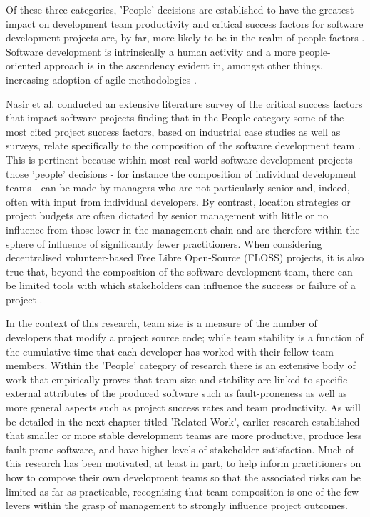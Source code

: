Of these three categories, 'People' decisions are established to have the greatest impact on development team productivity \citep{trendowicz2009factors} and critical success factors for software development projects are, by far, more likely to be in the realm of people factors \citep{boehm1978characteristics, onoue2018human}. Software development is intrinsically a human activity and a more people-oriented approach is in the ascendency evident in, amongst other things, increasing adoption of agile methodologies \citep{pirzadeh2010human}.

Nasir et al. \citep{nasir2011critical} conducted an extensive literature survey of the critical success factors that impact software projects finding that in the People category some of the most cited project success factors, based on industrial case studies as well as surveys, relate specifically to the composition of the software development team \citep{schmidt2001identifying, sauer2003state, humphrey2005big, kappelman2006early, glass2006standish}. This is pertinent because within most real world software development projects those 'people' decisions - for instance the composition of individual development teams - can be made by managers who are not particularly senior and, indeed, often with input from individual developers. By contrast, location strategies or project budgets are often dictated by senior management with little or no influence from those lower in the management chain and are therefore within the sphere of influence of significantly fewer practitioners. When considering decentralised volunteer-based Free Libre Open-Source (FLOSS) projects, it is also true that, beyond the composition of the software development team, there can be limited tools with which stakeholders can influence the success or failure of a project \citep{schweik2008brooks}.

In the context of this research, team size is a measure of the number of developers that modify a project source code; while team stability is a function of the cumulative time that each developer has worked with their fellow team members. Within the 'People' category of research there is an extensive body of work that empirically proves that team size and stability are linked to specific external attributes of the produced software such as fault-proneness as well as more general aspects such as project success rates and team productivity. As will be detailed in the next chapter titled 'Related Work', earlier research established that smaller or more stable development teams are more productive, produce less fault-prone software, and have higher levels of stakeholder satisfaction.  Much of this research has been motivated, at least in part, to help inform practitioners on how to compose their own development teams so that the associated risks can be limited as far as practicable, recognising that team composition is one of the few levers within the grasp of management to strongly influence project outcomes. 

